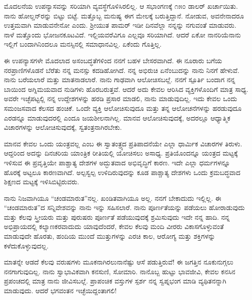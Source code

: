 ಮೊದಲನೆಯ ಉಪನ್ಯಾಸವನ್ನು ಸರಿಯಾಗಿ ವ್ಯವಸ್ಥೆಗೊಳಿಸಿರಲಿಲ್ಲ. ಆ ಸಭಾಂಗಣಕ್ಕೆ ೧೫೦ ಡಾಲರ್ ಖರ್ಚಾಯಿತು. ನಾನು ಹೋಲ್ಡನ್‌ರನ್ನು ಬಿಟ್ಟು ಬಿಟ್ಟೆ. ಮತ್ತೊಬ್ಬ ಮನುಷ್ಯ ಈಗ ಮೇಲಕ್ಕೆ ಬರುತ್ತಿದ್ದಾನೆ. ನೋಡುವ, ಅವನೇನಾದರೂ ಉತ್ತಮವಾಗಿ ಮಾಡುವನೇನೋ ಎಂದು. ಶ‍್ರೀಯುತ ಪಾಮರ್ ಇಡೀ ದಿನವೆಲ್ಲಾ ನನ್ನನ್ನು ನಗುವಂತೆ ಮಾಡುವರು. ನಾಳೆ ಮತ್ತೊಂದು ಭೋಜನಕೂಟವಿದೆ. ಇಲ್ಲಿಯವರೆವಿಗೂ ಎಲ್ಲವೂ ಸರಿಯಾಗಿದೆ. ಆದರೆ ಏಕೋ ನಾನರಿಯೆ\enginline{-}ನಾನು ಇಲ್ಲಿಗೆ ಬಂದಾಗಿನಿಂದಲೂ ಮನಸ್ಸಿನಲ್ಲಿ ಸಮಾಧಾನವಿಲ್ಲ. ಏಕೆಂದು ಗೊತ್ತಿಲ್ಲ.

ಈ ಉಪನ್ಯಾಸಗಳೇ ಮೊದಲಾದ ಅಸಂಬದ್ಧತೆಗಳಿಂದ ನನಗೆ ಬಹಳ ಬೇಸರವಾಗಿದೆ. ಈ ನೂರಾರು ಬಗೆಯ ನರಪ್ರಾಣಿಗಳೊಡನೆ ಬೆರೆತು ನನ್ನ ಮನಸ್ಸು ಕದಡಿಹೋಗಿದೆ. ನನ್ನ ಅಭಿರುಚಿ ಏನೆಂಬುದನ್ನು ನಾನು ನಿನಗೆ ಹೇಳುವೆ. ನಾನು ಬರೆಯಲಾರೆ ಮತ್ತು ಮಾತನಾಡಲಾರೆ. ನಾನು ಗಾಢವಾಗಿ ಆಲೋಚಿಸಬಲ್ಲೆ. ನನಗೆ ಸ್ಪೂರ್ತಿ ಬಂದಾಗ ನನ್ನ ಬಾಯಿಂದ ಅಗ್ನಿಮಯವಾದ ನುಡಿಗಳು ಹೊರಬರುತ್ತವೆ. ಆದರೆ ಅದು ಕೇವಲ ಆರಿಸಿದ ವ್ಯಕ್ತಿಗಳೊಂದಿಗೆ ಮಾತ್ರ ಸಾಧ್ಯ. ಅವರೇ ಇಚ್ಛೆಪಟ್ಟಲ್ಲಿ ನನ್ನ ಉದ್ದೇಶಗಳನ್ನು ಹರಡಿ ಪ್ರಸಾರ ಮಾಡಲಿ, ನಾನು ಮಾಡುವುದಿಲ್ಲ. ಇದು ಕೇವಲ ಒಂದು ಸಮಂಜಸವಾದ ಕೆಲಸದ ಹಂಚಿಕೆ. ಒಂದೇ ವ್ಯಕ್ತಿ ಆಲೋಚಿಸುವುದೂ ಮತ್ತು ತನ್ನ ಆಲೋಚನೆಗಳನ್ನು ಹರಡುವುದೂ ಎರಡನ್ನೂ ಮಾಡುವುದರಲ್ಲಿ ಎಂದೂ ಜಯಶೀಲನಾಗಿಲ್ಲ. ಮಾನವ ಆಲೋಚಿಸುವುದಕ್ಕೆ, ಅದರಲ್ಲೂ ಆಧ್ಯಾತ್ಮಿಕ ವಿಚಾರಗಳನ್ನು ಆಲೋಚಿಸುವುದಕ್ಕೆ, ಸ್ವತಂತ್ರನಾಗಿರಬೇಕು.

\vspace{0.1cm}

ಮಾನವ ಕೇವಲ ಒಂದು ಯಂತ್ರವಲ್ಲ ಎಂಬ ಈ ಸ್ವಾತಂತ್ರ್ಯದ ಪ್ರತಿಪಾದನೆಯೇ ಎಲ್ಲಾ ಧಾರ್ಮಿಕ ವಿಚಾರಗಳ ತಿರುಳು. ಆದ್ದರಿಂದ ಅದನ್ನು ದಿನಚರಿಯ ಯಾಂತ್ರಿಕ ರೀತಿಯಲ್ಲಿ ಯೋಚಿಸಲು ಅಸಾಧ್ಯ. ಪ್ರತಿಯೊಂದನ್ನೂ ಯಂತ್ರದ ಮಟ್ಟಕ್ಕೆ ಇಳಿಸುವ ಈ ಪ್ರವೃತ್ತಿಯೇ ಪಾಶ್ಚಾತ್ಯ ದೇಶಗಳ ಅದ್ಭುತವಾದ ಅಭಿವೃದ್ಧಿಗೆ ಕಾರಣ. ಇದೇ ಎಲ್ಲಾ ಧರ್ಮಗಳನ್ನೂ ಹೊರಕ್ಕೆ ಅಟ್ಟಲೂ ಕಾರಣವಾಗಿದೆ. ಅಲ್ಪಸ್ವಲ್ಪ ಉಳಿದಿರುವುದನ್ನು ಕೂಡ ಪಾಶ್ಚಾತ್ಯ ದೇಶಗಳು ಒಂದು ಕ್ರಮಬದ್ಧವಾದ ಶಿಕ್ಷಣದ ಮಟ್ಟಕ್ಕೆ ಇಳಿಸಿಬಿಟ್ಟಿರುವರು.

ನಾನು ನಿಜವಾಗಿಯೂ “ಚಂಡಮಾರುತ”ನಲ್ಲ. ಖಂಡಿತವಾಗಿಯೂ ಅಲ್ಲ. ನನಗೆ ಬೇಕಾದುದು ಇಲ್ಲಿಲ್ಲ. ಈ “ಚಂಡಮಾರುತ”ದ ಸನ್ನಿವೇಶವನ್ನು ನಾನು ಇನ್ನು ಸಹಿಸಲಾರೆ. ನಾನು ಪೂರ್ಣತೆಯನ್ನು ಪಡೆಯಲು ಹೋರಾಡುವುದು ಮತ್ತು ಕೆಲವು ಸ್ತ್ರೀಯರು ಮತ್ತು ಪುರುಷರು ಪೂರ್ಣತೆ ಪಡೆಯುವುದಕ್ಕೆ ಶ್ರಮಿಸುವುದು \enginline{-} ಇದೇ ನನ್ನ ಹಾದಿ. ನನ್ನ ಅಭಿಪ್ರಾಯದಲ್ಲಿ ಕಲ್ಯಾಣಕರವಾದುದು ಯಾವುದೆಂದರೆ, ಕೇವಲ ಕೆಲವು ಮಂದಿ ವೀರರು ವಿಕಾಸಗೊಳ್ಳುವಂತೆ ಮಾಡುವುದೇ ಹೊರತು, ಹಂದಿಯ ಮುಂದೆ ಮುತ್ತುಗಳನ್ನು ಎರಚಿ ಕಾಲ, ಆರೋಗ್ಯ ಮತ್ತು ಶಕ್ತಿಗಳನ್ನು ಕಳೆದುಕೊಳ್ಳುವುದಲ್ಲ.

\vspace{0.1cm}
ಮಾತನ್ನೇ ಆಡದೆ ಕೆಲವು ವರುಷಗಳು ಮೂಕನಾಗಿರಲುನಾನೆಷ್ಟು ಆಸೆ ಪಡುತ್ತಿರುವೆ! ಈ ಜಗತ್ತಿನ ನೂಕುನುಗ್ಗಲು ನನಗಾಗುವುದಿಲ್ಲ. ನಾನು ಸ್ವಾಭಾವಿಕವಾಗಿ ಕನಸುಣಿ, ಸೋಮಾರಿ. ನಾನೊಬ್ಬ ಹುಟ್ಟು ಭಾವಜೀವಿ, ಕೇವಲ ಕನಸಿನ ಪ್ರಪಂಚದಲ್ಲಿ ಮಾತ್ರ ನಾನು ಜೀವಿಸಬಲ್ಲೆ. ಪ್ರಾಪಂಚಿಕ ವಸ್ತುಗಳ ಸ್ಪರ್ಶ ನನ್ನ ಸ್ವಪ್ನಭಂಗ ಮಾಡಿ ವ್ಯಥಿತನನ್ನಾಗಿ ಮಾಡುವುದು. ಆದರೆ ಭಗವಂತನ ಇಚ್ಛೆಯಿದ್ದಂತಾಗಲಿ!

\vspace{0.1cm}

